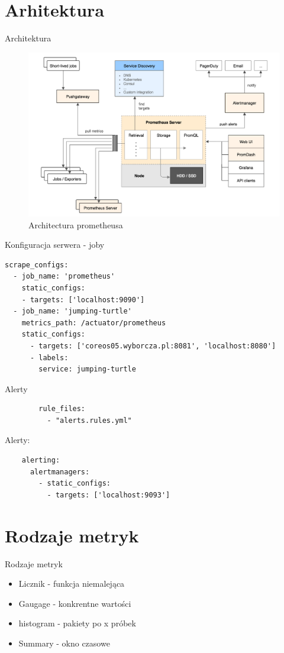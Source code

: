 \documentclass[epic,eepic,aspectratio=169,12pt]{beamer}
\begin{document}
\section{Arhitektura}
\begin{frame}{Architektura}
		\begin{figure}
			\centering
			\includegraphics[width=0.55\linewidth]{architecture}
			\caption{Architectura prometheusa}
			\label{fig:architecture}
		\end{figure}
\end{frame}
\begin{frame}[fragile]{Konfiguracja serwera - joby}
	\begin{verbatim}
scrape_configs:		
  - job_name: 'prometheus'
    static_configs:
    - targets: ['localhost:9090']		
  - job_name: 'jumping-turtle'
    metrics_path: /actuator/prometheus
    static_configs:
      - targets: ['coreos05.wyborcza.pl:8081', 'localhost:8080']
	  - labels:
        service: jumping-turtle
	\end{verbatim}
\end{frame}
\begin{frame}[fragile]{Alerty}
	\begin{verbatim}
		rule_files:
		  - "alerts.rules.yml"		  
	\end{verbatim}
	Alerty:
	\begin{verbatim}
	alerting:
	  alertmanagers:
	    - static_configs:
	      - targets: ['localhost:9093']
	\end{verbatim}
\end{frame}
\section{Rodzaje metryk}
\begin{frame}{Rodzaje metryk}
	\begin{itemize}
		\item Licznik - funkcja niemalejąca
		\item Gaugage - konkrentne wartości
		\item histogram - pakiety po x próbek
		\item Summary - okno czasowe
	\end{itemize}
\end{frame}
\end{document}
